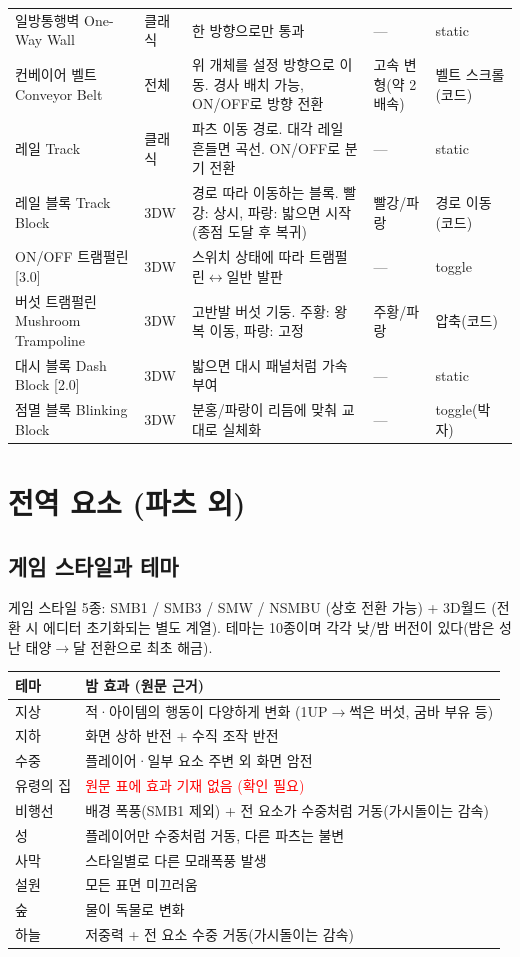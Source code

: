 \documentclass[10pt,a4paper]{article}
\begin{document}
\begin{longtable}{L{2.9cm} L{1.4cm} L{6.2cm} L{2.7cm} L{1.8cm}}
일방통행벽 One-Way Wall & 클래식 & 한 방향으로만 통과 & — & static \\
컨베이어 벨트 Conveyor Belt & 전체 & 위 개체를 설정 방향으로 이동. 경사 배치 가능, ON/OFF로 방향 전환 & 고속 변형(약 2배속) & 벨트 스크롤(코드) \\
레일 Track & 클래식 & 파츠 이동 경로. 대각 레일 흔들면 곡선. ON/OFF로 분기 전환 & — & static \\
레일 블록 Track Block & 3DW & 경로 따라 이동하는 블록. 빨강: 상시, 파랑: 밟으면 시작(종점 도달 후 복귀) & 빨강/파랑 & 경로 이동(코드) \\
ON/OFF 트램펄린 [3.0] & 3DW & 스위치 상태에 따라 트램펄린$\leftrightarrow$일반 발판 & — & toggle \\
버섯 트램펄린 Mushroom Trampoline & 3DW & 고반발 버섯 기둥. 주황: 왕복 이동, 파랑: 고정 & 주황/파랑 & 압축(코드) \\
대시 블록 Dash Block [2.0] & 3DW & 밟으면 대시 패널처럼 가속 부여 & — & static \\
점멸 블록 Blinking Block & 3DW & 분홍/파랑이 리듬에 맞춰 교대로 실체화 & — & toggle(박자) \\
\bottomrule
\end{longtable}

\section{전역 요소 (파츠 외)}

\subsection{게임 스타일과 테마}

게임 스타일 5종: SMB1 / SMB3 / SMW / NSMBU (상호 전환 가능) + 3D월드
(전환 시 에디터 초기화되는 별도 계열). 테마는 10종이며 각각 낮/밤 버전이
있다(밤은 성난 태양$\to$달 전환으로 최초 해금).

\begin{longtable}{L{2.2cm} L{13.2cm}}
\toprule
\textbf{테마} & \textbf{밤 효과 (원문 근거)} \\
\midrule
지상 & 적·아이템의 행동이 다양하게 변화 (1UP$\to$썩은 버섯, 굼바 부유 등) \\
지하 & 화면 상하 반전 + 수직 조작 반전 \\
수중 & 플레이어·일부 요소 주변 외 화면 암전 \\
유령의 집 & \textcolor{red}{원문 표에 효과 기재 없음 (확인 필요)} \\
비행선 & 배경 폭풍(SMB1 제외) + 전 요소가 수중처럼 거동(가시돌이는 감속) \\
성 & 플레이어만 수중처럼 거동, 다른 파츠는 불변 \\
사막 & 스타일별로 다른 모래폭풍 발생 \\
설원 & 모든 표면 미끄러움 \\
숲 & 물이 독물로 변화 \\
하늘 & 저중력 + 전 요소 수중 거동(가시돌이는 감속) \\
\bottomrule
\end{longtable}
\end{document}
